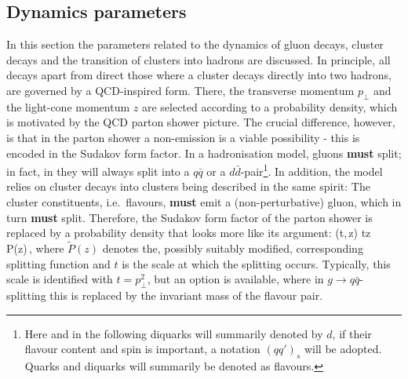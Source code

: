 \documentclass[a4paper,fleqn,10pt]{article}
\begin{document}
\begin{appendix}
\section{Dynamics parameters}
\label{Sec::Dynamics}
In this section the parameters related to the dynamics of gluon decays, 
cluster decays and the transition of clusters into hadrons are discussed.  In 
principle, all decays apart from direct those where a cluster decays directly 
into two hadrons, are governed by a QCD-inspired form.  There, the transverse 
momentum $p_\perp$ and the light-cone momentum $z$ are selected according to a 
probability density, which is motivated by the QCD parton shower picture.  The
crucial difference, however, is that in the parton shower a non-emission is
a viable possibility - this is encoded in the Sudakov form factor.  In a
hadronisation model, gluons {\bf must} split; in fact, in \Ahadic they will 
always split into a $q\bar q$ or a $d\bar d$-pair\footnote{
  Here and in the following diquarks will summarily denoted by $d$, if their 
  flavour content and spin is important, a notation $(qq')_s$ will be adopted.
  Quarks and diquarks will summarily be denoted as flavours.}.  
In addition, the \Ahadic model relies on cluster decays into clusters being 
described in the same spirit: The cluster constituents, i.e.\ flavours, 
{\bf must} emit a (non-perturbative) gluon, which in turn {\bf must}
split.  Therefore, the Sudakov form factor of the parton shower is replaced by
a probability density that looks more like its argument:
\beq
\label{Eq:splittingprob}
(t,\,z) \propto 
\done t\done z
\,\tilde P(z)\,,
\eeq
where $\tilde P(z)$ denotes the, possibly suitably modified, corresponding 
splitting function and $t$ is the scale at which the splitting occurs.  
Typically, this scale is identified with $t=p_\perp^2$, but an option
is available, where in $g\to q\bar q$-splitting this is replaced by the
invariant mass of the flavour pair.


\end{appendix}
\end{document}
